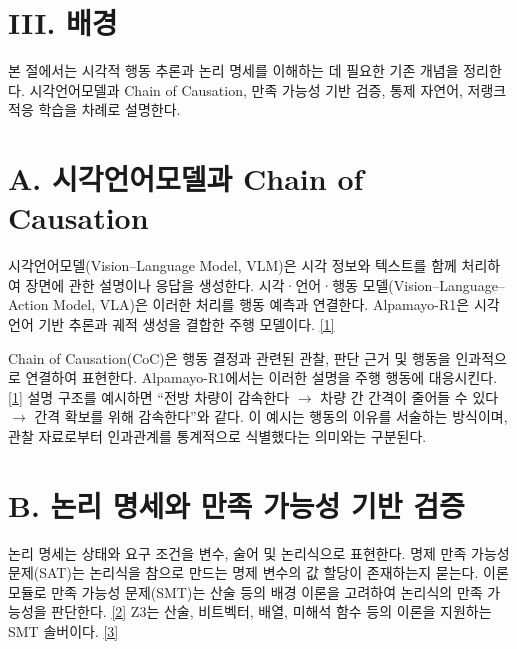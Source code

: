 \documentclass[11pt,a4paper]{article}
\begin{document}
\section*{III. 배경}


본 절에서는 시각적 행동 추론과 논리 명세를 이해하는 데 필요한 기존 개념을 정리한다. 시각언어모델과 Chain of Causation, 만족 가능성 기반 검증, 통제 자연어, 저랭크 적응 학습을 차례로 설명한다.\par

\section*{A. 시각언어모델과 Chain of Causation}

시각언어모델(Vision–Language Model, VLM)은 시각 정보와 텍스트를 함께 처리하여 장면에 관한 설명이나 응답을 생성한다. 시각·언어·행동 모델(Vision–Language–Action Model, VLA)은 이러한 처리를 행동 예측과 연결한다. Alpamayo-R1은 시각언어 기반 추론과 궤적 생성을 결합한 주행 모델이다. \href{\detokenize{https://arxiv.org/abs/2511.00088}}{[1]}\par

Chain of Causation(CoC)은 행동 결정과 관련된 관찰, 판단 근거 및 행동을 인과적으로 연결하여 표현한다. Alpamayo-R1에서는 이러한 설명을 주행 행동에 대응시킨다. \href{\detokenize{https://arxiv.org/abs/2511.00088}}{[1]} 설명 구조를 예시하면 “전방 차량이 감속한다 \ensuremath{\rightarrow} 차량 간 간격이 줄어들 수 있다 \ensuremath{\rightarrow} 간격 확보를 위해 감속한다”와 같다. 이 예시는 행동의 이유를 서술하는 방식이며, 관찰 자료로부터 인과관계를 통계적으로 식별했다는 의미와는 구분된다.\par

\section*{B. 논리 명세와 만족 가능성 기반 검증}

논리 명세는 상태와 요구 조건을 변수, 술어 및 논리식으로 표현한다. 명제 만족 가능성 문제(SAT)는 논리식을 참으로 만드는 명제 변수의 값 할당이 존재하는지 묻는다. 이론 모듈로 만족 가능성 문제(SMT)는 산술 등의 배경 이론을 고려하여 논리식의 만족 가능성을 판단한다. \href{\detokenize{https://theory.stanford.edu/~barrett/pubs/BT18.pdf}}{[2]} Z3는 산술, 비트벡터, 배열, 미해석 함수 등의 이론을 지원하는 SMT 솔버이다. \href{\detokenize{https://doi.org/10.1007/978-3-540-78800-3_24}}{[3]}\par
\end{document}

